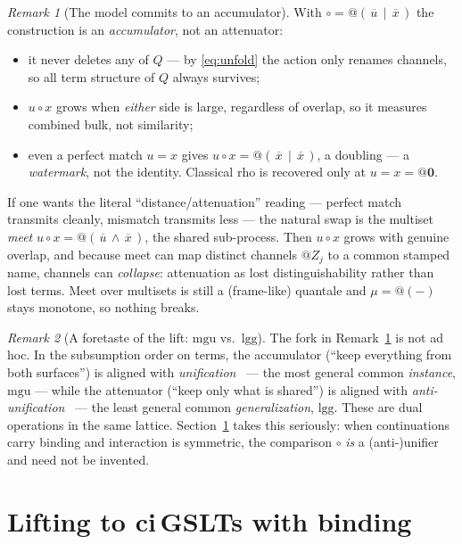 \documentclass[11pt]{article}
\makeatletter
\theoremstyle{plain}
\theoremstyle{definition}
\theoremstyle{remark}
\newtheorem{remark}{Remark}
\newcommand{\nil}{\mathbf{0}}
\newcommand{\quo}[1]{@#1}
\newcommand{\dr}[1]{\,\overline{#1}\,}   %
\newcommand{\cmp}{\mathbin{\circ}}       %
\newcommand{\meas}{\mu}
\newcommand{\mgu}{\mathrm{mgu}}
\newcommand{\lgg}{\mathrm{lgg}}
\makeatother
\begin{document}
\begin{remark}[The model commits to an accumulator]\label{rem:fork}
With $\cmp=\quo{(\dr u\mid \dr x)}$ the construction is an \emph{accumulator}, not an attenuator:
\begin{itemize}
\item it never deletes any of $Q$ --- by \eqref{eq:unfold} the action only renames channels, so all
term structure of $Q$ always survives;
\item $u\cmp x$ grows when \emph{either} side is large, regardless of overlap, so it measures combined
bulk, not similarity;
\item even a perfect match $u=x$ gives $u\cmp x=\quo{(\dr x\mid \dr x)}$, a doubling --- a
\emph{watermark}, not the identity. Classical rho is recovered only at $u=x=\quo\nil$.
\end{itemize}
If one wants the literal ``distance/attenuation'' reading --- perfect match transmits cleanly,
mismatch transmits less --- the natural swap is the multiset \emph{meet}
$u\cmp x=\quo{(\dr u\wedge \dr x)}$, the shared sub-process. Then $u\cmp x$ grows with genuine
overlap, and because meet can map distinct channels $\quo{Z_j}$ to a common stamped name, channels
can \emph{collapse}: attenuation as lost distinguishability rather than lost terms. Meet over
multisets is still a (frame-like) quantale and $\meas=\quo{(-)}$ stays monotone, so nothing breaks.
\end{remark}

\begin{remark}[A foretaste of the lift: $\mgu$ vs.\ $\lgg$]\label{rem:foretaste}
The fork in Remark~\ref{rem:fork} is not ad hoc. In the subsumption order on terms, the accumulator
(``keep everything from both surfaces'') is aligned with \emph{unification}~\cite{robinson} --- the most general common
\emph{instance}, $\mgu$ --- while the attenuator (``keep only what is shared'') is aligned with
\emph{anti-unification}~\cite{plotkin,reynolds} --- the least general common \emph{generalization}, $\lgg$. These are dual
operations in the same lattice. Section~\ref{sec:lift} takes this seriously: when continuations carry
binding and interaction is symmetric, the comparison $\cmp$ \emph{is} a (anti-)unifier and need not be
invented.
\end{remark}

\section{Lifting to ci\,GSLTs with binding}\label{sec:lift}
\end{document}
